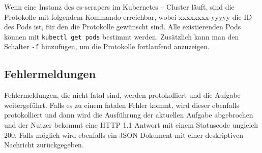 Wenn eine Instanz des es-scrapers im Kubernetes – Cluster läuft, sind die Protokolle
mit folgendem Kommando erreichbar, wobei xxxxxxxx-yyyyy die ID des Pods ist, für den
die Protokolle gewünscht sind. Alle existierenden Pods können mit \texttt{kubectl get pods}
bestimmt werden.
Zusätzlich kann man den Schalter \verb|-f| hinzufügen, um die Protokolle fortlaufend anzuzeigen.

\subsection{Fehlermeldungen}
Fehlermeldungen, die nicht fatal sind, werden protokolliert und die Aufgabe weitergeführt. Falls es zu einem fatalen Fehler kommt, wird dieser ebenfalls protokolliert und dann wird die Ausführung der aktuellen Aufgabe abgebrochen und der Nutzer bekommt eine HTTP 1.1 Antwort mit einem Statuscode ungleich 200. Falls möglich wird ebenfalls ein JSON Dokument mit einer deskriptiven Nachricht zurückgegeben.










